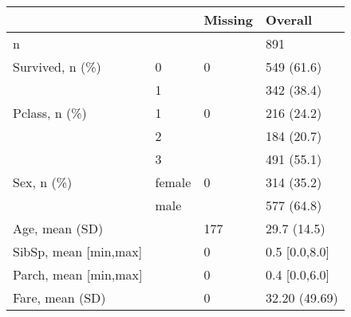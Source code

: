 \documentclass[preview]{standalone}
\begin{document}
    \begin{tabular}{llll}
\toprule
                &      & Missing &        Overall \\
\midrule
n & {} &         &            891 \\
Survived, n (\%) & 0 &       0 &     549 (61.6) \\
                & 1 &         &     342 (38.4) \\
Pclass, n (\%) & 1 &       0 &     216 (24.2) \\
                & 2 &         &     184 (20.7) \\
                & 3 &         &     491 (55.1) \\
Sex, n (\%) & female &       0 &     314 (35.2) \\
                & male &         &     577 (64.8) \\
Age, mean (SD) &      &     177 &    29.7 (14.5) \\
SibSp, mean [min,max] &      &       0 &  0.5 [0.0,8.0] \\
Parch, mean [min,max] &      &       0 &  0.4 [0.0,6.0] \\
Fare, mean (SD) &      &       0 &  32.20 (49.69) \\
\bottomrule
\end{tabular}

    
\end{document}
